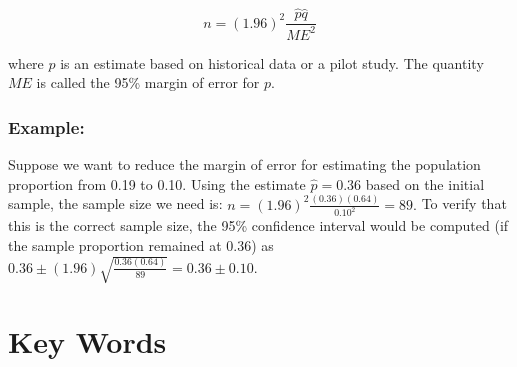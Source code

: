 \documentclass[11pt]{book}\usepackage[]{graphicx}\usepackage[]{color}
\begin{document}

\vspace{3mm}

\begin{equation*}
 n = (1.96)^2 \frac{ \hat{p} \hat{q}}{ME^2}
\end{equation*}

\vspace{3mm}

where $\hat{p}$ is an estimate based on historical data or a pilot study.  The quantity $ME$ is called the 95\% margin of error for $p$.


\subsubsection{Example:}

Suppose we want to reduce the margin of error for estimating the population proportion from 0.19 to 0.10.  Using the estimate $\hat{p} = 0.36$  based on the initial sample, the sample size we need is: $n = (1.96)^2 \frac{(0.36)(0.64)}{0.10^2} = 89.$  To verify that this is the correct sample size, the 95\% confidence interval would be computed (if the sample proportion remained at 0.36) as $0.36 \pm (1.96) \sqrt{ \frac{0.36(0.64)}{89}} = 0.36 \pm 0.10$.

\section{Key Words}

\end{document}
